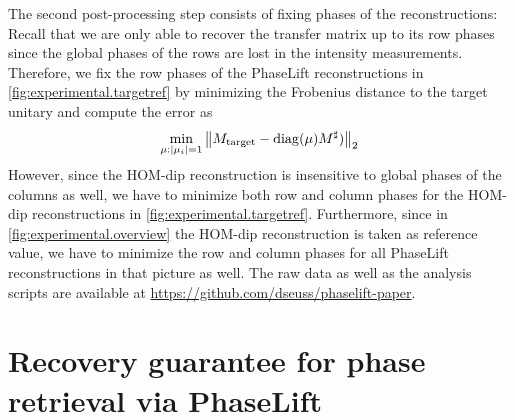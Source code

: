 The second post-processing step consists of fixing phases of the reconstructions:
Recall that we are only able to recover the transfer matrix up to its row phases since the global phases of the rows are lost in the intensity measurements.
Therefore, we fix the row phases of the PhaseLift reconstructions in \cref{fig:experimental.targetref} by minimizing the Frobenius distance to the target unitary and compute the error as
\begin{equation}
  \min_{{\mu}: {\vert\mu_i\vert} = 1}\left\|  {M}_\mathrm{target} -  \mathrm{diag} ({\mu}) {M}^\sharp) \right\|_2
\end{equation}
However, since the HOM-dip reconstruction is insensitive to global phases of the columns as well, we have to minimize both row and column phases for the HOM-dip reconstructions in \cref{fig:experimental.targetref}.
Furthermore, since in \cref{fig:experimental.overview} the HOM-dip reconstruction is taken as reference value, we have to minimize the row and column phases for all PhaseLift reconstructions in that picture as well.
The raw data as well as the analysis scripts are available at \url{https://github.com/dseuss/phaselift-paper}.

\section{Recovery guarantee for phase retrieval via PhaseLift}%
\label{sec:pl.guarantee_phase_retrieval}

